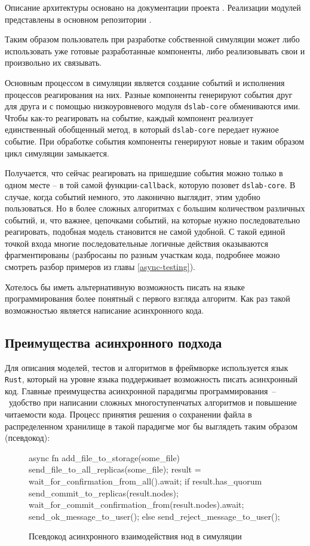 Описание архитектуры основано на документации проекта \cite{dslab-architecture}.  Реализации модулей представлены в основном репозитории \cite{dslab-repo}.

Таким образом пользователь при разработке собственной симуляции может либо использовать уже готовые разработанные компоненты, либо реализовывать свои и произвольно их связывать. 

Основным процессом в симуляции является создание событий и исполнения процессов реагирования на них. Разные компоненты генерируют события друг для друга и с помощью низкоуровневого модуля \texttt{dslab-core} обмениваются ими. Чтобы как-то реагировать на событие, каждый компонент реализует единственный обобщенный метод, в который \texttt{dslab-core} передает нужное событие. При обработке события компоненты генерируют новые и таким образом цикл симуляции замыкается. 

Получается, что сейчас реагировать на пришедшие события можно только в одном месте -- в той самой функции-\texttt{callback}, которую позовет \texttt{dslab-core}. В случае, когда событий немного, это лаконично выглядит, этим удобно пользоваться. Но в более сложных алгоритмах с большим количеством различных событий, и, что важнее, цепочками событий, на которые нужно последовательно реагировать, подобная модель становится не самой удобной. С такой единой точкой входа многие последовательные логичные действия оказываются фрагментированы (разбросаны по разным участкам кода, подробнее можно смотреть разбор примеров из главы \ref{async-testing}). 

Хотелось бы иметь альтернативную возможность писать на языке программирования более понятный с первого взгляда алгоритм. Как раз такой возможностью является написание асинхронного кода.


\subsection{Преимущества асинхронного подхода}

Для описания моделей, тестов и алгоритмов в фреймворке используется язык \texttt{Rust}, который на уровне языка поддерживает возможность писать асинхронный код. Главные преимущества асинхронной парадигмы программирования~--~удобство при написании сложных многоступенчатых алгоритмов и повышение читаемости кода. Процесс принятия решения о сохранении файла в распределенном хранилище в такой парадигме мог бы выглядеть таким образом (псевдокод):

\begin{figure}[H]
    \small
\begin{rustcode}
    async fn add_file_to_storage(some_file) {
        send_file_to_all_replicas(some_file);
        result = wait_for_confirmation_from_all().await;
        if result.has_quorum {
            send_commit_to_replicas(result.nodes);
            wait_for_commit_confirmation_from(result.nodes).await;
            send_ok_message_to_user();
        } else {
            send_reject_message_to_user();
        }
    }
\end{rustcode}
\caption{Псевдокод асинхронного взаимодействия нод в симуляции}
\label{pseudocode}
\end{figure}

